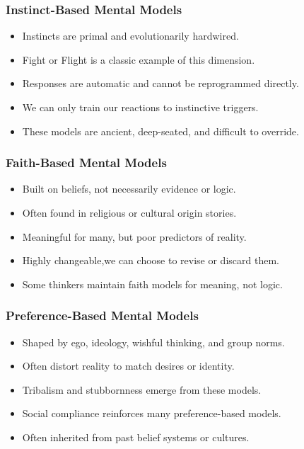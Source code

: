 \begin{frame}[fragile]\frametitle{Instinct-Based Mental Models}
      \begin{itemize}
        \item Instincts are primal and evolutionarily hardwired.
        \item Fight or Flight is a classic example of this dimension.
        \item Responses are automatic and cannot be reprogrammed directly.
        \item We can only train our reactions to instinctive triggers.
        \item These models are ancient, deep-seated, and difficult to override.
      \end{itemize}
\end{frame}

\begin{frame}[fragile]\frametitle{Faith-Based Mental Models}
      \begin{itemize}
        \item Built on beliefs, not necessarily evidence or logic.
        \item Often found in religious or cultural origin stories.
        \item Meaningful for many, but poor predictors of reality.
        \item Highly changeable,we can choose to revise or discard them.
        \item Some thinkers maintain faith models for meaning, not logic.
      \end{itemize}
\end{frame}

\begin{frame}[fragile]\frametitle{Preference-Based Mental Models}
      \begin{itemize}
        \item Shaped by ego, ideology, wishful thinking, and group norms.
        \item Often distort reality to match desires or identity.
        \item Tribalism and stubbornness emerge from these models.
        \item Social compliance reinforces many preference-based models.
        \item Often inherited from past belief systems or cultures.
      \end{itemize}
\end{frame}

